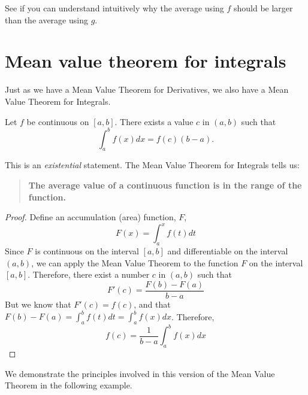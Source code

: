 \documentclass{ximera}
\begin{document}
See if you can understand intuitively why the average using $f$ should
be larger than the average using $g$.  %



\section{Mean value theorem for integrals}

Just as we have a Mean Value Theorem for Derivatives, we also have a
Mean Value Theorem for Integrals.


\begin{theorem}
Let $f$ be continuous on $[a,b]$. There exists a value $c$ in $(a,b)$
such that
\[
\int_a^bf(x) dx = f(c)(b-a).
\]
\end{theorem}

This is an \emph{existential} statement. The Mean Value Theorem for
Integrals tells us:
\begin{quote}
\textbf{The average value of a continuous function is in the range of
  the function.}
\end{quote}
\begin{proof}
Define an accumulation (area) function, $F$,
\[
F(x)= \int_a^x f(t) dt 
\]
Since $F$ is continuous on the interval $[a,b]$ and differentiable on the interval $(a,b)$, we can apply the Mean Value Theorem to the function $F$ on the interval $[a,b]$.
Therefore, there exist a number $c$ in $(a,b)$ such that
\[
F'(c)=\frac{F(b)-F(a)}{b-a}
\]
But we know that $F'(c)=f(c)$, and that $F(b)-F(a)=\int_a^bf(t) dt =\int_a^bf(x) dx $.
Therefore,
\[
f(c)=\frac{1}{b-a}\int_a^bf(x) dx
\]
\end{proof}
We demonstrate the principles involved in this version of the Mean
Value Theorem in the following example.
\end{document}
